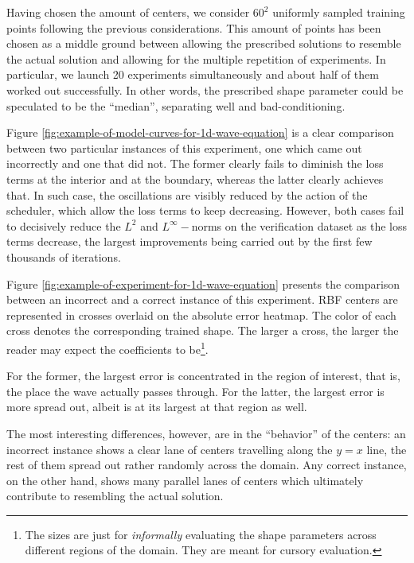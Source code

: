 \documentclass[12pt]{report} %
\begin{document}
Having chosen the amount of centers, we consider $60^2$ uniformly sampled training points following the previous considerations. This amount of points has been chosen as a middle ground between allowing the prescribed solutions to resemble the actual solution and allowing for the multiple repetition of experiments. In particular, we launch 20 experiments simultaneously and about half of them worked out successfully. In other words, the prescribed shape parameter could be speculated to be the ``median'', separating well and bad-conditioning.


Figure \ref{fig:example-of-model-curves-for-1d-wave-equation} is a clear comparison between two particular instances of this experiment, one which came out incorrectly and one that did not. The former clearly fails to diminish the loss terms at the interior and at the boundary, whereas the latter clearly achieves that. In such case, the oscillations are visibly reduced by the action of the scheduler, which allow the loss terms to keep decreasing. However, both cases fail to decisively reduce the $L^2$ and $L^\infty-$norms on the verification dataset as the loss terms decrease, the largest improvements being carried out by the first few thousands of iterations.

Figure \ref{fig:example-of-experiment-for-1d-wave-equation} presents the comparison between an incorrect and a correct instance of this experiment. RBF centers are represented in crosses overlaid on the absolute error heatmap. The color of each cross denotes the corresponding trained shape. The larger a cross, the larger the reader may expect the coefficients to be\footnote{The sizes are just for \textit{informally} evaluating the shape parameters across different regions of the domain. They are meant for cursory evaluation.}.



For the former, the largest error is concentrated in the region of interest, that is, the place the wave actually passes through. For the latter, the largest error is more spread out, albeit is at its largest at that region as well. 


The most interesting differences, however, are in the ``behavior'' of the centers: an incorrect instance shows a clear lane of centers travelling along the $y=x$ line, the rest of them spread out rather randomly across the domain. Any correct instance, on the other hand, shows many parallel lanes of centers which ultimately contribute to resembling the actual solution. 
\end{document}
